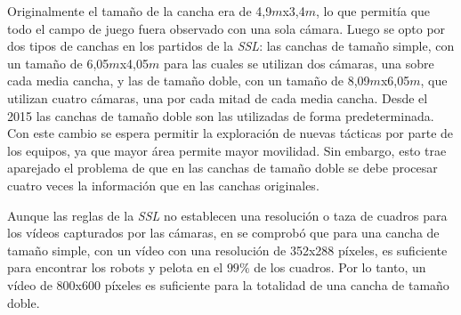 Originalmente el tamaño de la cancha era de 4,9$m$x3,4$m$, lo que permitía que
todo el campo de juego fuera observado con una sola cámara. Luego se opto por
dos tipos de canchas en los partidos de la \emph{SSL}: las canchas de tamaño
simple, con un tamaño de 6,05$m$x4,05$m$ para las cuales se utilizan dos
cámaras, una sobre cada media cancha, y las de tamaño doble, con un tamaño de
8,09$m$x6,05$m$, que utilizan cuatro cámaras, una por cada mitad de cada media
cancha. Desde el 2015 las canchas de tamaño doble son las utilizadas de forma
predeterminada\cite{sslrules2015}. Con este cambio se espera permitir la
exploración de nuevas tácticas por parte de los equipos, ya que mayor área
permite mayor movilidad. Sin embargo, esto trae aparejado el problema de que en
las canchas de tamaño doble se debe procesar cuatro veces la información que en
las canchas originales.

Aunque las reglas de la \emph{SSL} no establecen una resolución o taza de
cuadros para los vídeos capturados por las cámaras, en \cite{torres2014} se
comprobó que para una cancha de tamaño simple, con un vídeo con una resolución
de 352x288 píxeles, es suficiente para encontrar los robots y pelota en el
$99\%$ de los cuadros. Por lo tanto, un vídeo de 800x600 píxeles es suficiente
para la totalidad de una cancha de tamaño doble.
